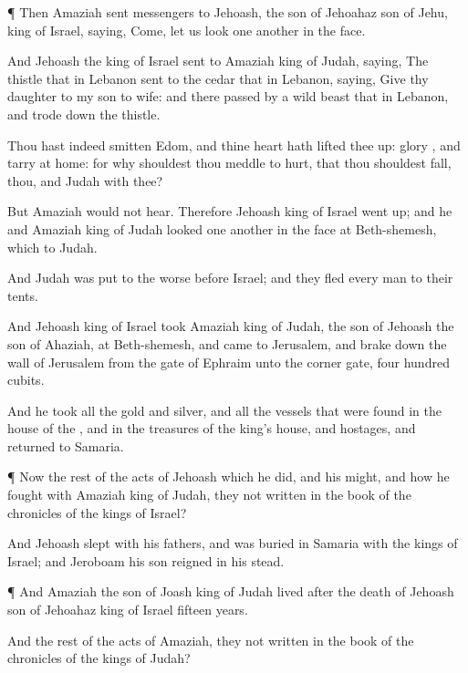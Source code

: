 {\par }{\PP {}¶ Then
Amaziah
sent
messengers to
Jehoash, the
son of
Jehoahaz
son of
Jehu,
king of
Israel,
saying,
Come, let us
look one another in the
face.

And
Jehoash the
king of
Israel
sent to
Amaziah
king of
Judah,
saying, The
thistle that
{} in
Lebanon
sent to the
cedar that
{} in
Lebanon,
saying,
Give thy
daughter to my
son to
wife: and there
passed by a
wild
beast that
{} in
Lebanon, and trode
down the
thistle.

Thou hast
indeed
smitten
Edom, and thine
heart hath lifted thee
up:
glory
{}, and
tarry at
home: for why shouldest thou
meddle to
{}
hurt, that thou shouldest
fall,
{} thou, and
Judah with thee?

But
Amaziah would not
hear. Therefore
Jehoash
king of
Israel went
up; and he and
Amaziah
king of
Judah
looked one another in the
face at
Beth-shemesh, which
{} to
Judah.

And
Judah was put to the
worse
before
Israel; and they
fled every
man to their
tents.

And
Jehoash
king of
Israel
took
Amaziah
king of
Judah, the
son of
Jehoash the
son of
Ahaziah, at
Beth-shemesh, and
came to
Jerusalem, and brake
down the
wall of
Jerusalem from the
gate of
Ephraim unto the
corner
gate,
four
hundred
cubits.

And he
took all the
gold and
silver, and all the
vessels that were
found in the
house of the
{}, and in the
treasures of the
king’s
house, and
hostages, and
returned to
Samaria.


\par }{\PP {}¶ Now the
rest of the
acts of
Jehoash which he
did, and his
might, and how he
fought with
Amaziah
king of
Judah,
{} they not
written in the
book of the
chronicles of the
kings of
Israel?

And
Jehoash
slept with his
fathers, and was
buried in
Samaria with the
kings of
Israel; and
Jeroboam his
son
reigned in his stead.


\par }{\PP {}¶ And
Amaziah the
son of
Joash
king of
Judah
lived
after the
death of
Jehoash
son of
Jehoahaz
king of
Israel
fifteen
years.

And the
rest of the
acts of
Amaziah,
{} they not
written in the
book of the
chronicles of the
kings of
Judah?

}
